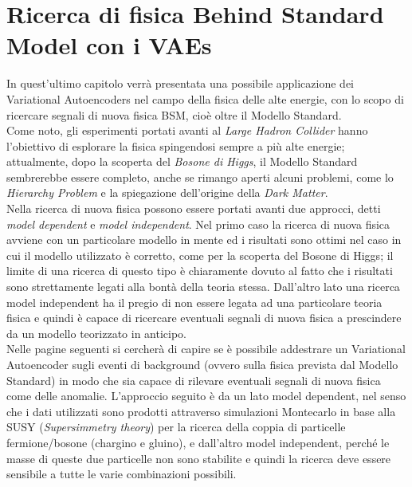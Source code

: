 \section{Ricerca di fisica Behind Standard Model con i VAEs}
\label{fisica_BSM_VAEs}

In quest'ultimo capitolo verrà presentata una possibile applicazione dei Variational Autoencoders nel campo della fisica delle alte energie, con lo scopo di ricercare segnali di nuova fisica BSM, cioè oltre il Modello Standard. \\
Come noto, gli esperimenti portati avanti al \textit{Large Hadron Collider} hanno l'obiettivo di esplorare la fisica spingendosi sempre a più alte energie; attualmente, dopo la scoperta del \textit{Bosone di Higgs}, il Modello Standard sembrerebbe essere completo, anche se rimango aperti alcuni problemi, come lo \textit{Hierarchy Problem} e la spiegazione dell'origine della \textit{Dark Matter}. \\
Nella ricerca di nuova fisica possono essere portati avanti due approcci, detti \textit{model dependent} e \textit{model independent}. Nel primo caso la ricerca di nuova fisica avviene con un particolare modello in mente ed i risultati sono ottimi nel caso in cui il modello utilizzato è corretto, come per la scoperta del Bosone di Higgs; il limite di una ricerca di questo tipo è chiaramente dovuto al fatto che i risultati sono strettamente legati alla bontà della teoria stessa. Dall'altro lato una ricerca model independent ha il pregio di non essere legata ad una particolare teoria fisica e quindi è capace di ricercare eventuali segnali di nuova fisica a prescindere da un modello teorizzato in anticipo.\\
Nelle pagine seguenti si cercherà di capire se è possibile addestrare un Variational Autoencoder sugli eventi di background (ovvero sulla fisica prevista dal Modello Standard) in modo che sia capace di rilevare eventuali segnali di nuova fisica come delle anomalie. L'approccio seguito è da un lato model dependent, nel senso che i dati utilizzati sono prodotti attraverso simulazioni Montecarlo in base alla SUSY (\textit{Supersimmetry theory}) per la ricerca della coppia di particelle fermione/bosone (chargino e gluino), e dall'altro model independent, perché le masse di queste due particelle non sono stabilite e quindi la ricerca deve essere sensibile a tutte le varie combinazioni possibili.
